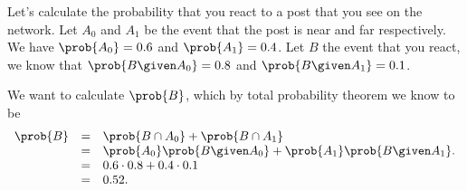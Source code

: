 {\begin{example}
Let's calculate the probability that you react to a post that you see
on the network.
%
Let $A_0$ and $A_1$ be the event that the post is near and far
respectively.
%
We have $\prob{A_0} = 0.6$ and   $\prob{A_1} = 0.4$.
%
Let $B$ the event that you react, we know that  $\prob{B \given A_0} =
0.8$ and $\prob{B \given A_1} = 0.1$.
%

We want to calculate $\prob{B}$, which by total probability theorem we
know to be 
\[
\begin{array}{lll}
\prob{B} 
& = &   \prob{B \cap A_0} + \prob{B \cap  A_1} 
\\
& = &  \prob{A_0}\prob{B \given A_0} + \prob{A_1}\prob{B \given  A_1}. 
\\
& = &  0.6 \cdot 0.8 +  0.4 \cdot 0.1
\\
& = &  0.52.
\end{array}
\] 

\end{example}

\begin{comment}

\paragraph{Bayes' Rule and Inference}

An important application of conditional probabilities is \defn{Bayes'
  Rule}, which can be stated as follows.
%
For any event $A$ and $B$ such that $\prob{B} > 0$, 
\[
\prob{A \given B} 
= 
\frac
{\prob{A} \prob{B \given A}}
{\prob{B}}.
\]
%
Bayes' rule follows easily by the definition of conditional
probability, because $\prob{A} \prob{B \given A} = \prob{A \cap B}$.

The importance of Bayes' rule is that it allows us to reverse the
direction of the conditional probability: when we are given the
probability of $B$ given $A$, we can infer the probability of $A$
given $B$.
%
This is sometimes referred as \defn{probabilistic inference}.


A common application of Bayes' Rule in the real world is inferring of
causes of an effect.  
%
More precisely, suppose that we observe an effect $B$ and we know the
probability that we would observe $B$ given $A$, i.e., $\prob{B \given
  A}$.
%
We want to know the probability that that the cause is indeed $A$,
i.e., $\prob{A \given B}$, which we can by using Bayes' Rule.

\begin{example}
We know that the probability of seeing smoke $B$ when there is fire
$A$ is $\prob{B \given A} = 0.9$ and that probability of seeing smoke
even when there is no fire is $\prob{B \given A^c} = 0.005$.
%
We also know independently that the probability
of having a fire at any time  is $\prob{A} = 0.001$.
%
Let's assume that we see some smoke and calculate the probability that
there is fire.
%
Let's consider the event $A^c$ that we don't see any fire, i.e., the
complement of $A$.  We have $\prob{A^c} = 0.009$. 
%
By using the total probability theorem, we have 
\[
\prob{B} = \prob{A} \prob{B | A} +  \prob{A^c} \prob{B | A^c}.
\]
This we can calculate as 
\[
\prob{B} = 0.001 \cdot  0.9 +  0.009 \cdot 0.005 = 0.000945
\]


\end{comment}}
